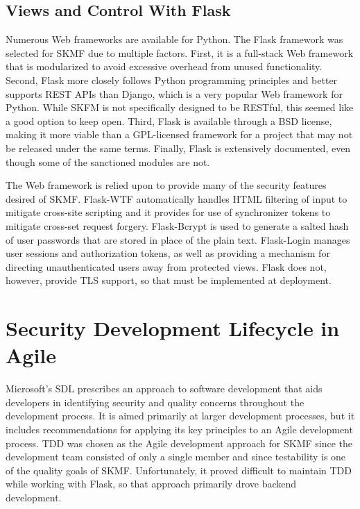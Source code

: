 \subsection{Views and Control With Flask}

Numerous Web frameworks are available for Python. The Flask framework was selected for SKMF due to multiple factors. First, it is a full-stack Web framework that is modularized to avoid excessive overhead from unused functionality. Second, Flask more closely follows Python programming principles and better supports REST APIs than Django, which is a very popular Web framework for Python. While SKFM is not specifically designed to be RESTful, this seemed like a good option to keep open. Third, Flask is available through a BSD license, making it more viable than a GPL-licensed framework for a project that may not be released under the same terms. Finally, Flask is extensively documented, even though some of the sanctioned modules are not.

The Web framework is relied upon to provide many of the security features desired of SKMF. Flask-WTF automatically handles HTML filtering of input to mitigate cross-site scripting and it provides for use of synchronizer tokens to mitigate cross-set request forgery. Flask-Bcrypt is used to generate a salted hash of user passwords that are stored in place of the plain text. Flask-Login manages user sessions and authorization tokens, as well as providing a mechanism for directing unauthenticated users away from protected views. Flask does not, however, provide TLS support, so that must be implemented at deployment.


\section{Security Development Lifecycle in Agile}

Microsoft's SDL prescribes an approach to software development that aids developers in identifying security and quality concerns throughout the development process. It is aimed primarily at larger development processes, but it includes recommendations for applying its key principles to an Agile development process. TDD was chosen as the Agile development approach for SKMF since the development team consisted of only a single member and since testability is one of the quality goals of SKMF. Unfortunately, it proved difficult to maintain TDD while working with Flask, so that approach primarily drove backend development.


